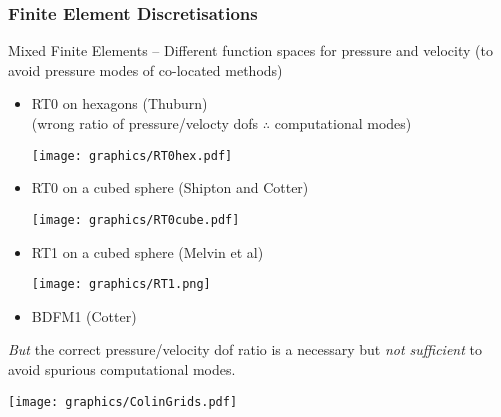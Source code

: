 \begin{frame}
\frametitle{Finite Element Discretisations}

Mixed Finite Elements -- Different function spaces for pressure and velocity (to avoid pressure modes of co-located methods)

\pause
\begin{itemize}[<+->]
    \item
           \begin{minipage}[t]{0.65\linewidth}\raggedright
           RT0 on hexagons (Thuburn) \\
           (wrong ratio of pressure/velocty dofs $\therefore$ computational modes)
           \end{minipage}\hfill
           \begin{minipage}[c]{0.3\linewidth}
               \texttt{[image: graphics/RT0hex.pdf]}
           \end{minipage}
    \item
          \begin{minipage}[t]{0.65\linewidth}\raggedright
        RT0 on a cubed sphere (Shipton and Cotter)
          \end{minipage}\hfill
          \begin{minipage}[c]{0.3\linewidth}
              \texttt{[image: graphics/RT0cube.pdf]}
          \end{minipage}
    \item
          \begin{minipage}[t]{0.65\linewidth}\raggedright
              RT1 on a cubed sphere (Melvin et al)
          \end{minipage}\hfill
          \begin{minipage}[c]{0.3\linewidth}
      \texttt{[image: graphics/RT1.png]}
          \end{minipage}
    \item BDFM1 (Cotter)
\end{itemize}
\pause
{\em But} the correct pressure/velocity dof ratio is a necessary but {\em not sufficient} to avoid spurious computational modes.
\end{frame}

\begin{frame}
\texttt{[image: graphics/ColinGrids.pdf]}
\end{frame}

